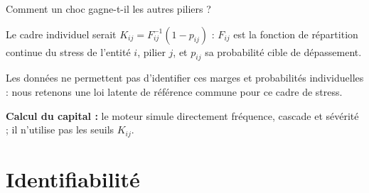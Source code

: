 \documentclass[aspectratio=169,10pt,t]{beamer}
\begin{document}
\begin{frame}{Comment un choc gagne-t-il les autres piliers ?}
{}\par\vspace{2.5mm}
  \raggedright\footnotesize
  Le cadre individuel serait $K_{ij}=F_{ij}^{-1}(1-p_{ij})$ : $F_{ij}$ est la fonction de répartition continue du stress
  de l'entité $i$, pilier $j$, et $p_{ij}$ sa probabilité cible de dépassement.\par\vspace{1mm}
  Les données ne permettent pas d'identifier ces marges et probabilités individuelles : nous retenons une loi latente
  de référence commune pour ce cadre de stress.\par\vspace{1.5mm}
  \textbf{Calcul du capital :} le moteur simule directement fréquence, cascade et sévérité ; il n'utilise pas les seuils $K_{ij}$.
\end{frame}









\section{Identifiabilité}
\end{document}
